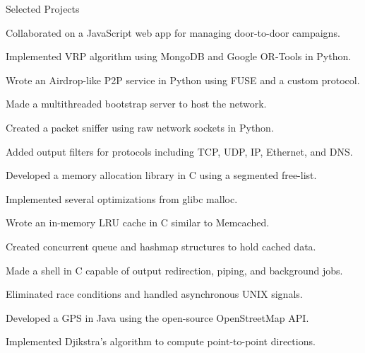 \documentclass{cv}
\begin{document}
\begin{cvsection}{Selected Projects}
  {
    \item Collaborated on a JavaScript web app for managing door-to-door campaigns.
    \item Implemented VRP algorithm using MongoDB and Google OR-Tools in Python.
  }
  {
    \item Wrote an Airdrop-like P2P service in Python using FUSE and a custom protocol.
    \item Made a multithreaded bootstrap server to host the network.
  }
  {
    \item Created a packet sniffer using raw network sockets in Python.
    \item Added output filters for protocols including TCP, UDP, IP, Ethernet, and DNS.
  }
  {
    \item Developed a memory allocation library in C using a segmented free-list.
    \item Implemented several optimizations from glibc malloc.
  }
  {
    \item Wrote an in-memory LRU cache in C similar to Memcached.
    \item Created concurrent queue and hashmap structures to hold cached data.
  }
  {
    \item Made a shell in C capable of output redirection, piping, and background jobs. 
    \item Eliminated race conditions and handled asynchronous UNIX signals.
  }
  {
    \item Developed a GPS in Java using the open-source OpenStreetMap API.
    \item Implemented Djikstra's algorithm to compute point-to-point directions.
  }
\end{cvsection}
\end{document}
